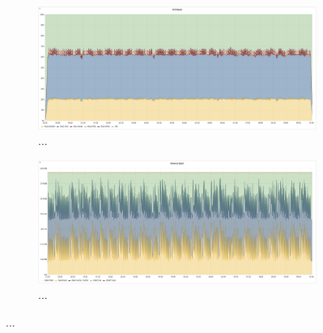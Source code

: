 \begin{figure}[H]
    \begin{subfigure}[h]{0.5\linewidth}
        \centering
        \includegraphics[width=1\linewidth]{other-fig/tests/lj_wf_cpu.png}
        \caption{...}
    \end{subfigure}
    \hfill
    \begin{subfigure}[h]{0.5\linewidth}
        \centering
        \includegraphics[width=1\linewidth]{other-fig/tests/lj_wf_ram.png}
        \caption{...}
    \end{subfigure}
    \caption{...}
\end{figure}

